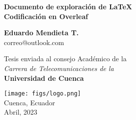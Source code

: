 \documentclass[11pt]{report}
\begin{document}
    \begin{titlepage}
        \begin{center}
            {\huge \bfseries Documento de exploración de \LaTeX \\ Codificación en Overleaf} \\
            \vspace{2cm}

            {\Large \bfseries Eduardo Mendieta T.} \\ [5pt] {correo@outlook.com} \\
            \vspace{3cm}

            {Tesis enviada al consejo Académico de la } \\ [15pt] \emph{Carrera de Telecomunicaciones de la} \\ [3cm]
            {\bfseries Universidad de Cuenca}
            \vfill %

            \texttt{[image: figs/logo.png]} \\ [1cm]
            {Cuenca, Ecuador} \\ [5pt] 
            {Abril, 2023}
        \end{center}
    \end{titlepage}
\end{document}
